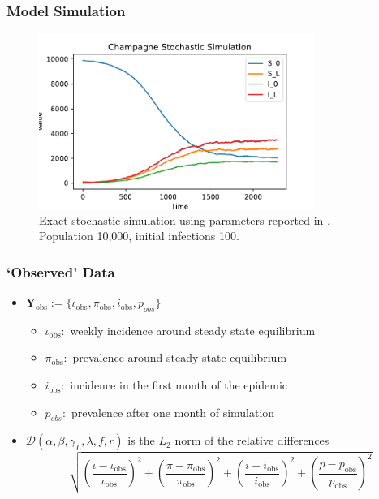 \documentclass{beamer}
\begin{document}

\begin{frame}
    \frametitle{Model Simulation}
    \begin{figure}
        \centering
        \includegraphics[width=0.8\textwidth]{
            ../../champagne_GP_images/champagne_simulation.pdf
        }
        \caption{
            Exact stochastic simulation using parameters reported in
            \cite{champagne_using_2022}. Population 10,000, initial infections 100.
        }
    \end{figure}
\end{frame}

\begin{frame}
    \frametitle{`Observed' Data}
    \begin{itemize}
        \item $\mathbf{Y}_\text{obs} := \{\iota_\text{obs}, \pi_\text{obs}, i_\text{obs}, p_{obs}\}$
              \begin{itemize}
                  \item $\iota_\text{obs}:$ weekly incidence around steady state equilibrium
                  \item $\pi_\text{obs}:$ prevalence around steady state equilibrium
                  \item $i_\text{obs}:$ incidence in the first month of the epidemic
                  \item $p_{obs}:$ prevalence after one month of simulation
              \end{itemize}
        \item <2-> $
                  \mathcal{D}(\alpha, \beta, \gamma_L, \lambda, f, r)$ is the
              $L_2$ norm of the relative differences
              $$
                  \sqrt{
                      \left(\frac{\iota - \iota_\text{obs}}{\iota_\text{obs}}\right)^2
                      + \left(\frac{\pi - \pi_\text{obs}}{\pi_\text{obs}}\right)^2
                      + \left(\frac{i - i_\text{obs}}{i_\text{obs}}\right)^2
                      + \left(\frac{p - p_\text{obs}}{p_\text{obs}}\right)^2
                  }
              $$
    \end{itemize}
\end{frame}
\end{document}
